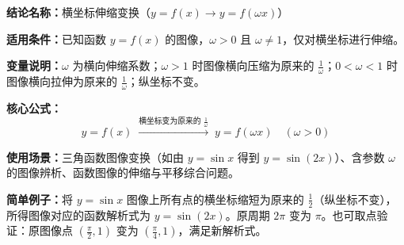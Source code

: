 \textbf{结论名称：}横坐标伸缩变换（\(y=f(x)\to y=f(\omega x)\)）

\textbf{适用条件：}已知函数 \(y=f(x)\) 的图像，\(\omega>0\) 且 \(\omega\neq 1\)，仅对横坐标进行伸缩。

\textbf{变量说明：}\(\omega\) 为横向伸缩系数；\(\omega>1\) 时图像横向压缩为原来的 \(\frac1\omega\)；\(0<\omega<1\) 时图像横向拉伸为原来的 \(\frac1\omega\)；纵坐标不变。

\textbf{核心公式：}
\[
\boxed{y=f(x)\;\xrightarrow{\text{横坐标变为原来的 }\frac{1}{\omega}}\;y=f(\omega x)\quad (\omega>0)}
\]

\textbf{使用场景：}三角函数图像变换（如由 \(y=\sin x\) 得到 \(y=\sin(2x)\)）、含参数 \(\omega\) 的图像辨析、函数图像的伸缩与平移综合问题。

\textbf{简单例子：}将 \(y=\sin x\) 图像上所有点的横坐标缩短为原来的 \(\frac12\)（纵坐标不变），所得图像对应的函数解析式为 \(y=\sin(2x)\)。原周期 \(2\pi\) 变为 \(\pi\)。也可取点验证：原图像点 \((\frac{\pi}{2},1)\) 变为 \((\frac{\pi}{4},1)\)，满足新解析式。
